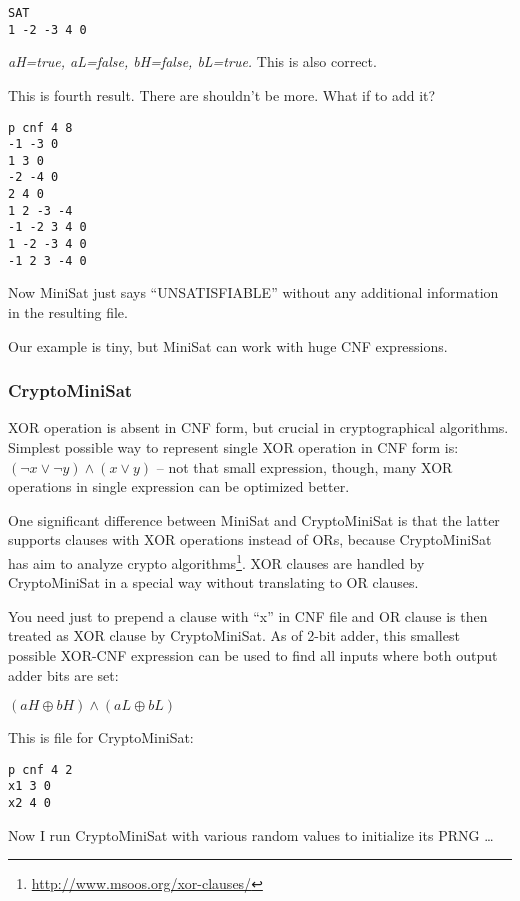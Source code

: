 \begin{lstlisting}
SAT
1 -2 -3 4 0
\end{lstlisting}

\textit{aH=true, aL=false, bH=false, bL=true.} This is also correct.

This is fourth result. There are shouldn't be more. What if to add it?

\begin{lstlisting}
p cnf 4 8
-1 -3 0
1 3 0
-2 -4 0
2 4 0
1 2 -3 -4
-1 -2 3 4 0
1 -2 -3 4 0
-1 2 3 -4 0
\end{lstlisting}

Now MiniSat just says ``UNSATISFIABLE'' without any additional information in the resulting file.

Our example is tiny, but MiniSat can work with huge \ac{CNF} expressions.

\subsubsection{CryptoMiniSat}

XOR operation is absent in \ac{CNF} form, but crucial in cryptographical algorithms.
Simplest possible way to represent single XOR operation in \ac{CNF} form is:
$(\neg x \vee \neg y) \wedge (x \vee y)$ -- not that small expression, 
though, many XOR operations in single expression can be optimized better.

One significant difference between MiniSat and CryptoMiniSat is that
the latter supports clauses with XOR operations instead of ORs,
because CryptoMiniSat has aim to analyze crypto algorithms\footnote{\url{http://www.msoos.org/xor-clauses/}}.
XOR clauses are handled by CryptoMiniSat in a special way without translating to OR clauses.

You need just to prepend a clause with ``x'' in \ac{CNF} file and OR clause is then treated as XOR clause by CryptoMiniSat.
As of 2-bit adder, this smallest possible XOR-CNF expression can be used to find all inputs where both output adder bits are set:

$(aH \oplus bH) \wedge (aL \oplus bL)$

This is  file for CryptoMiniSat:

\begin{lstlisting}
p cnf 4 2
x1 3 0
x2 4 0
\end{lstlisting}

Now I run CryptoMiniSat with various random values to initialize its \ac{PRNG} \dots

